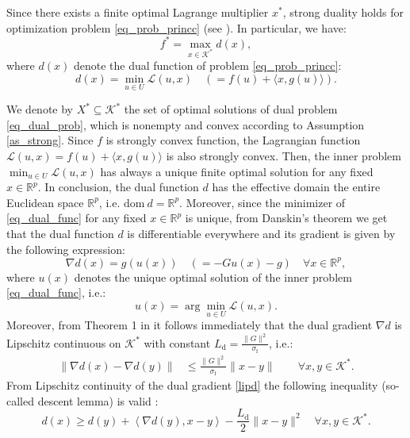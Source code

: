 \documentclass{gOMS2e}
\theoremstyle{plain}
\theoremstyle{definition}
\theoremstyle{remark}
\begin{document}
\noindent Since there exists  a finite optimal Lagrange
multiplier $x^*$,  strong duality holds for optimization problem
\eqref{eq_prob_princc} (see \cite{RocWet:98}). In particular, we
have:
\begin{equation}
\label{eq_dual_prob} f^*=\max_{x \in {\mathcal{K}}^*} d(x),
\end{equation}
where $d(x)$ denote the dual function of problem
\eqref{eq_prob_princc}:
\begin{equation}
\label{eq_dual_func} d(x)=\min_{u \in U} {\mathcal{L}} (u,x) \quad (= f(u)  +  \langle x, g(u) \rangle).
\end{equation}

\noindent  We  denote by $X^* \subseteq {\mathcal{K}}^*$ the set of optimal
solutions of dual problem \eqref{eq_dual_prob}, which is nonempty
and convex according to  Assumption  \ref{as_strong}. Since $f$ is
strongly convex function, the Lagrangian function ${\mathcal{L}}(u,x) = f(u) +
\langle x, g(u) \rangle$ is also strongly convex. Then, the inner
problem $\min_{u \in U} {\mathcal{L}} (u,x)$ has always a unique finite
optimal solution for any fixed $x \in {\mathbb{R}}^p$. In conclusion, the
dual function $d$ has the effective domain the entire Euclidean
space ${\mathbb{R}}^p$, i.e. $\text{dom} \ d = {\mathbb{R}}^p$. Moreover, since
the minimizer of \eqref{eq_dual_func} for any fixed $x \in {\mathbb{R}}^p$
is unique, from Danskin's theorem \cite{RocWet:98} we get that the
dual function $d$ is differentiable everywhere  and its gradient is
given by the following expression:
\begin{equation*}
\nabla d(x) = g(u(x)) \quad (= -G u(x) - g)   \quad \forall x \in
{\mathbb{R}}^p,
\end{equation*}
where $u(x)$ denotes the unique optimal solution of the inner
problem \eqref{eq_dual_func}, i.e.:
\begin{equation}
\label{eq_inner_sol} u(x)=\arg\min_{u \in U} {\mathcal{L}}(u,x).
\end{equation}
Moreover, from Theorem 1 in \cite{Nes:05} it follows immediately
that the dual gradient $\nabla d$ is Lipschitz continuous on ${\mathcal{K}}^*$
with constant $L_\text{d} = \frac{\|G\|^2}{\sigma_\text{f}}$, i.e.:
\begin{align}
\label{lipd} \| \nabla d(x) - \nabla d({y})\| &  \leq
\frac{\|G\|^2}{\sigma_\text{f}} \| x - {y}\| \qquad \forall x, {y}
\in {\mathcal{K}}^*.
\end{align}
From Lipschitz continuity of the dual gradient  \eqref{lipd} the
following inequality (so-called descent lemma) is valid
\cite{Nes:04,Nes:05}:
\begin{equation}
\label{eq_descent} d(x) \geq d({y})+ \left\langle \nabla d({y}), x -
{y}\right\rangle -\frac{L_{\text{d}}}{2}\|x - {y}\|^2 \quad \forall
x, {y} \in {\mathcal{K}}^*.
\end{equation}
\end{document}
